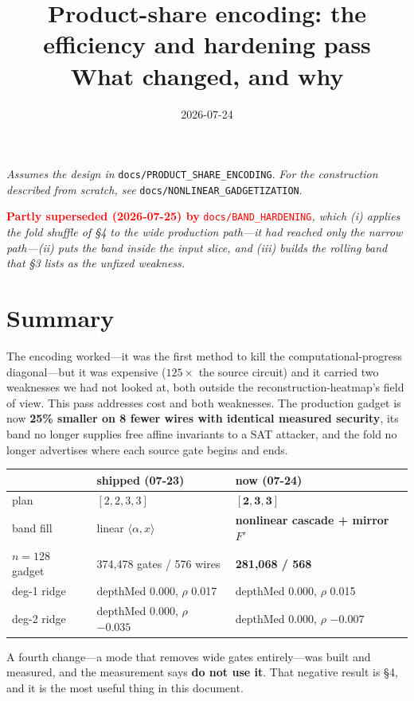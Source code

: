 \documentclass[11pt]{article}
\title{\textbf{Product-share encoding: the efficiency and hardening pass}\\[2pt]
\large What changed, and why}
\author{}
\date{2026-07-24}
\begin{document}
\maketitle

\noindent\emph{Assumes the design in} \texttt{docs/PRODUCT\_SHARE\_ENCODING}.
\emph{For the construction described from scratch, see}
\texttt{docs/NONLINEAR\_GADGETIZATION}.

\noindent\textcolor{red}{\textbf{Partly superseded (2026-07-25) by}
\texttt{docs/BAND\_HARDENING}}\emph{, which (i) applies the fold shuffle of
\S4 to the wide production path---it had reached only the narrow path---(ii)
puts the band inside the input slice, and (iii) builds the rolling band that
\S3 lists as the unfixed weakness.}

\section{Summary}

The encoding worked---it was the first method to kill the computational-progress
diagonal---but it was expensive ($125\times$ the source circuit) and it carried
two weaknesses we had not looked at, both outside the reconstruction-heatmap's
field of view. This pass addresses cost and both weaknesses. The production
gadget is now \textbf{25\% smaller on 8 fewer wires with identical measured
security}, its band no longer supplies free affine invariants to a SAT attacker,
and the fold no longer advertises where each source gate begins and ends.

\begin{center}
\begin{tabular}{lll}
\toprule
 & shipped (07-23) & now (07-24) \\
\midrule
plan & $[2,2,3,3]$ & $\mathbf{[2,3,3]}$ \\
band fill & linear $\langle\alpha,x\rangle$ & \textbf{nonlinear cascade + mirror $F'$} \\
$n{=}128$ gadget & 374{,}478 gates / 576 wires & \textbf{281{,}068 / 568} \\
deg-1 ridge & depthMed 0.000, $\rho$ 0.017 & depthMed 0.000, $\rho$ 0.015 \\
deg-2 ridge & depthMed 0.000, $\rho$ $-0.035$ & depthMed 0.000, $\rho$ $-0.007$ \\
\bottomrule
\end{tabular}
\end{center}

A fourth change---a mode that removes wide gates entirely---was built and
measured, and the measurement says \textbf{do not use it}. That negative result
is \S4, and it is the most useful thing in this document.
\end{document}
